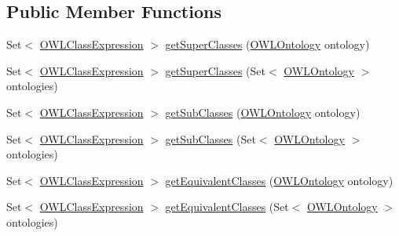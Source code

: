 \subsection*{Public Member Functions}
\begin{DoxyCompactItemize}
\item 
Set$<$ \hyperlink{interfaceorg_1_1semanticweb_1_1owlapi_1_1model_1_1_o_w_l_class_expression}{O\-W\-L\-Class\-Expression} $>$ \hyperlink{interfaceorg_1_1semanticweb_1_1owlapi_1_1model_1_1_o_w_l_class_a93547a2ae249ad884be060ced1b7fa9e}{get\-Super\-Classes} (\hyperlink{interfaceorg_1_1semanticweb_1_1owlapi_1_1model_1_1_o_w_l_ontology}{O\-W\-L\-Ontology} ontology)
\item 
Set$<$ \hyperlink{interfaceorg_1_1semanticweb_1_1owlapi_1_1model_1_1_o_w_l_class_expression}{O\-W\-L\-Class\-Expression} $>$ \hyperlink{interfaceorg_1_1semanticweb_1_1owlapi_1_1model_1_1_o_w_l_class_a4a4ec1165f9df340a3c031bfedfed476}{get\-Super\-Classes} (Set$<$ \hyperlink{interfaceorg_1_1semanticweb_1_1owlapi_1_1model_1_1_o_w_l_ontology}{O\-W\-L\-Ontology} $>$ ontologies)
\item 
Set$<$ \hyperlink{interfaceorg_1_1semanticweb_1_1owlapi_1_1model_1_1_o_w_l_class_expression}{O\-W\-L\-Class\-Expression} $>$ \hyperlink{interfaceorg_1_1semanticweb_1_1owlapi_1_1model_1_1_o_w_l_class_ac1aff8c7145ad691514fefe0396fd48b}{get\-Sub\-Classes} (\hyperlink{interfaceorg_1_1semanticweb_1_1owlapi_1_1model_1_1_o_w_l_ontology}{O\-W\-L\-Ontology} ontology)
\item 
Set$<$ \hyperlink{interfaceorg_1_1semanticweb_1_1owlapi_1_1model_1_1_o_w_l_class_expression}{O\-W\-L\-Class\-Expression} $>$ \hyperlink{interfaceorg_1_1semanticweb_1_1owlapi_1_1model_1_1_o_w_l_class_a95bf648d4fc1d37d01619bd5460a25b2}{get\-Sub\-Classes} (Set$<$ \hyperlink{interfaceorg_1_1semanticweb_1_1owlapi_1_1model_1_1_o_w_l_ontology}{O\-W\-L\-Ontology} $>$ ontologies)
\item 
Set$<$ \hyperlink{interfaceorg_1_1semanticweb_1_1owlapi_1_1model_1_1_o_w_l_class_expression}{O\-W\-L\-Class\-Expression} $>$ \hyperlink{interfaceorg_1_1semanticweb_1_1owlapi_1_1model_1_1_o_w_l_class_a555ba768b09e16ded5ab14452a83ecde}{get\-Equivalent\-Classes} (\hyperlink{interfaceorg_1_1semanticweb_1_1owlapi_1_1model_1_1_o_w_l_ontology}{O\-W\-L\-Ontology} ontology)
\item 
Set$<$ \hyperlink{interfaceorg_1_1semanticweb_1_1owlapi_1_1model_1_1_o_w_l_class_expression}{O\-W\-L\-Class\-Expression} $>$ \hyperlink{interfaceorg_1_1semanticweb_1_1owlapi_1_1model_1_1_o_w_l_class_a7786fb0193ac54ece58ebaa443b13274}{get\-Equivalent\-Classes} (Set$<$ \hyperlink{interfaceorg_1_1semanticweb_1_1owlapi_1_1model_1_1_o_w_l_ontology}{O\-W\-L\-Ontology} $>$ ontologies)

\end{DoxyCompactItemize}
